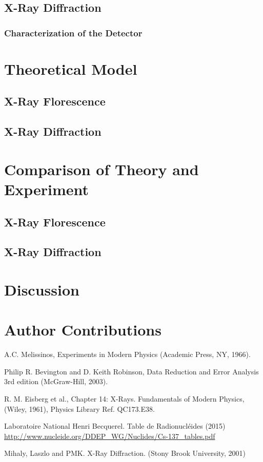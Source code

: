 \documentclass[%
 reprint,
 amsmath,amssymb,
 aps,
 pra,
]{revtex4-1}
\begin{document}
\subsection{X-Ray Diffraction}

\subsubsection{Characterization of the Detector}

\section{Theoretical Model}

\subsection{X-Ray Florescence}

\subsection{X-Ray Diffraction}

\section{Comparison of Theory and Experiment}

\subsection{X-Ray Florescence}

\subsection{X-Ray Diffraction}

\section{Discussion}

\section{Author Contributions}

\begin{thebibliography}{6}
	
	A.C. Melissinos, Experiments in Modern Physics (Academic Press, NY, 1966).
	
	Philip R. Bevington and D. Keith Robinson, Data Reduction and Error Analysis 3rd edition (McGraw-Hill, 2003).
	
	R. M. Eisberg et al., Chapter 14: X-Rays. Fundamentals of Modern Physics,  (Wiley, 1961), Physics Library Ref. QC173.E38.

	Laboratoire National Henri Becquerel. Table de Radionucléides (2015) \url{http://www.nucleide.org/DDEP_WG/Nuclides/Cs-137_tables.pdf}
	
	Mihaly, Laszlo and PMK. X-Ray Diffraction. (Stony Brook University, 2001)


\end{thebibliography}
\end{document}
